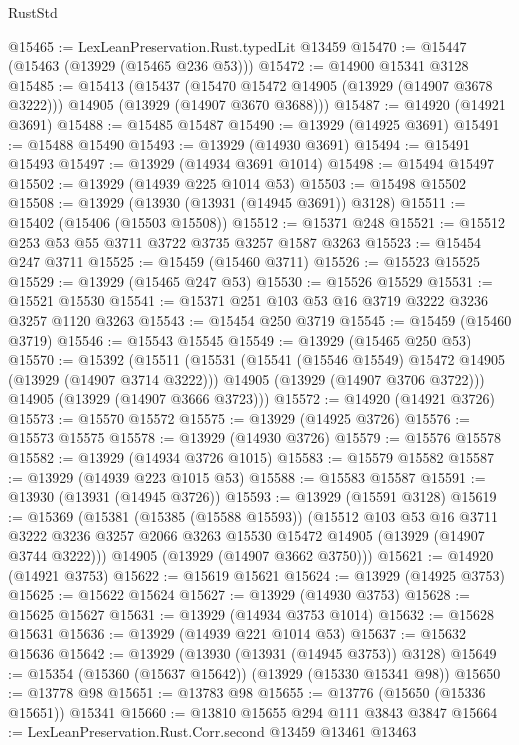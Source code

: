 \begin{lexlean}{RustStd}
\begin{coremodule}
@15465 := LexLeanPreservation.Rust.typedLit @13459
@15470 := @15447 (@15463 (@13929 (@15465 @236 @53)))
@15472 := @14900 @15341 @3128
@15485 := @15413
    (@15437
      (@15470 @15472 @14905 (@13929 (@14907 @3678 @3222)))
      @14905
      (@13929 (@14907 @3670 @3688)))
@15487 := @14920 (@14921 @3691)
@15488 := @15485 @15487
@15490 := @13929 (@14925 @3691)
@15491 := @15488 @15490
@15493 := @13929 (@14930 @3691)
@15494 := @15491 @15493
@15497 := @13929 (@14934 @3691 @1014)
@15498 := @15494 @15497
@15502 := @13929 (@14939 @225 @1014 @53)
@15503 := @15498 @15502
@15508 := @13929 (@13930 (@13931 (@14945 @3691)) @3128)
@15511 := @15402 (@15406 (@15503 @15508))
@15512 := @15371 @248
@15521 := @15512 @253 @53 @55 @3711 @3722 @3735 @3257 @1587 @3263
@15523 := @15454 @247 @3711
@15525 := @15459 (@15460 @3711)
@15526 := @15523 @15525
@15529 := @13929 (@15465 @247 @53)
@15530 := @15526 @15529
@15531 := @15521 @15530
@15541 := @15371 @251 @103 @53 @16 @3719 @3222 @3236 @3257 @1120 @3263
@15543 := @15454 @250 @3719
@15545 := @15459 (@15460 @3719)
@15546 := @15543 @15545
@15549 := @13929 (@15465 @250 @53)
@15570 := @15392
    (@15511
      (@15531
        (@15541 (@15546 @15549) @15472 @14905 (@13929 (@14907 @3714 @3222)))
        @14905
        (@13929 (@14907 @3706 @3722)))
      @14905
      (@13929 (@14907 @3666 @3723)))
@15572 := @14920 (@14921 @3726)
@15573 := @15570 @15572
@15575 := @13929 (@14925 @3726)
@15576 := @15573 @15575
@15578 := @13929 (@14930 @3726)
@15579 := @15576 @15578
@15582 := @13929 (@14934 @3726 @1015)
@15583 := @15579 @15582
@15587 := @13929 (@14939 @223 @1015 @53)
@15588 := @15583 @15587
@15591 := @13930 (@13931 (@14945 @3726))
@15593 := @13929 (@15591 @3128)
@15619 := @15369
    (@15381
      (@15385 (@15588 @15593))
      (@15512
        @103
        @53
        @16
        @3711
        @3222
        @3236
        @3257
        @2066
        @3263
        @15530
        @15472
        @14905
        (@13929 (@14907 @3744 @3222)))
      @14905
      (@13929 (@14907 @3662 @3750)))
@15621 := @14920 (@14921 @3753)
@15622 := @15619 @15621
@15624 := @13929 (@14925 @3753)
@15625 := @15622 @15624
@15627 := @13929 (@14930 @3753)
@15628 := @15625 @15627
@15631 := @13929 (@14934 @3753 @1014)
@15632 := @15628 @15631
@15636 := @13929 (@14939 @221 @1014 @53)
@15637 := @15632 @15636
@15642 := @13929 (@13930 (@13931 (@14945 @3753)) @3128)
@15649 := @15354 (@15360 (@15637 @15642)) (@13929 (@15330 @15341 @98))
@15650 := @13778 @98
@15651 := @13783 @98
@15655 := @13776 (@15650 (@15336 @15651)) @15341
@15660 := @13810 @15655 @294 @111 @3843 @3847
@15664 := LexLeanPreservation.Rust.Corr.second @13459 @13461 @13463

\end{coremodule}
\end{lexlean}
